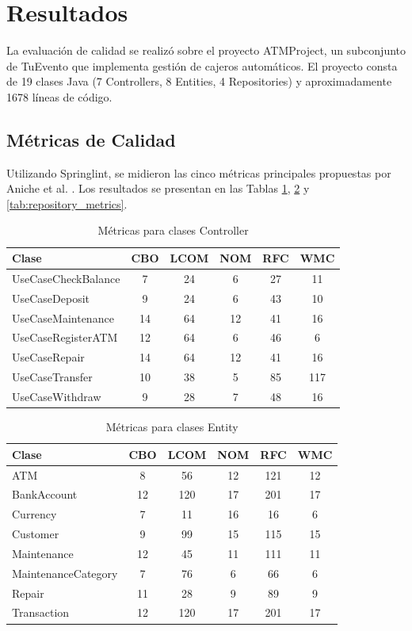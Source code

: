 \section{Resultados}

La evaluación de calidad se realizó sobre el proyecto ATMProject, un subconjunto de TuEvento que implementa gestión de cajeros automáticos. El proyecto consta de 19 clases Java (7 Controllers, 8 Entities, 4 Repositories) y aproximadamente 1678 líneas de código.

\subsection{Métricas de Calidad}
Utilizando Springlint, se midieron las cinco métricas principales propuestas por Aniche et al. \cite{aniche2016satt}. Los resultados se presentan en las Tablas \ref{tab:controller_metrics}, \ref{tab:entity_metrics} y \ref{tab:repository_metrics}.

\begin{table}[h]
\centering
\caption{Métricas para clases Controller}
\label{tab:controller_metrics}
\begin{tabular}{|l|c|c|c|c|c|}
\hline
Clase & CBO & LCOM & NOM & RFC & WMC \\
\hline
UseCaseCheckBalance & 7 & 24 & 6 & 27 & 11 \\
UseCaseDeposit & 9 & 24 & 6 & 43 & 10 \\
UseCaseMaintenance & 14 & 64 & 12 & 41 & 16 \\
UseCaseRegisterATM & 12 & 64 & 6 & 46 & 6 \\
UseCaseRepair & 14 & 64 & 12 & 41 & 16 \\
UseCaseTransfer & 10 & 38 & 5 & 85 & 117 \\
UseCaseWithdraw & 9 & 28 & 7 & 48 & 16 \\
\hline
\end{tabular}
\end{table}

\begin{table}[h]
\centering
\caption{Métricas para clases Entity}
\label{tab:entity_metrics}
\begin{tabular}{|l|c|c|c|c|c|}
\hline
Clase & CBO & LCOM & NOM & RFC & WMC \\
\hline
ATM & 8 & 56 & 12 & 121 & 12 \\
BankAccount & 12 & 120 & 17 & 201 & 17 \\
Currency & 7 & 11 & 16 & 16 & 6 \\
Customer & 9 & 99 & 15 & 115 & 15 \\
Maintenance & 12 & 45 & 11 & 111 & 11 \\
MaintenanceCategory & 7 & 76 & 6 & 66 & 6 \\
Repair & 11 & 28 & 9 & 89 & 9 \\
Transaction & 12 & 120 & 17 & 201 & 17 \\
\hline
\end{tabular}
\end{table}

